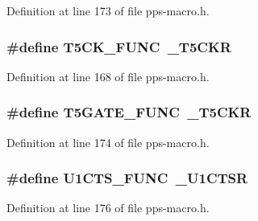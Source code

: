 Definition at line 173 of file pps-\/macro.\+h.

\hypertarget{pps-macro_8h_adc59be81afbd1289402baa70423e74bd}{}
\subsubsection[{T5\+C\+K\+\_\+\+F\+U\+N\+C}]{\setlength{\rightskip}{0pt plus 5cm}\#define T5\+C\+K\+\_\+\+F\+U\+N\+C~\+\_\+\+T5\+C\+K\+R}\label{pps-macro_8h_adc59be81afbd1289402baa70423e74bd}


Definition at line 168 of file pps-\/macro.\+h.

\hypertarget{pps-macro_8h_add7e882ae00488976899cb7c42273703}{}
\subsubsection[{T5\+G\+A\+T\+E\+\_\+\+F\+U\+N\+C}]{\setlength{\rightskip}{0pt plus 5cm}\#define T5\+G\+A\+T\+E\+\_\+\+F\+U\+N\+C~\+\_\+\+T5\+C\+K\+R}\label{pps-macro_8h_add7e882ae00488976899cb7c42273703}


Definition at line 174 of file pps-\/macro.\+h.

\hypertarget{pps-macro_8h_a93a74a3884ded23da27ffdd14a8a62ba}{}
\subsubsection[{U1\+C\+T\+S\+\_\+\+F\+U\+N\+C}]{\setlength{\rightskip}{0pt plus 5cm}\#define U1\+C\+T\+S\+\_\+\+F\+U\+N\+C~\+\_\+\+U1\+C\+T\+S\+R}\label{pps-macro_8h_a93a74a3884ded23da27ffdd14a8a62ba}


Definition at line 176 of file pps-\/macro.\+h.

\hypertarget{pps-macro_8h_a86f7c4fcf36e022fae9045ef369c49a1}{}
